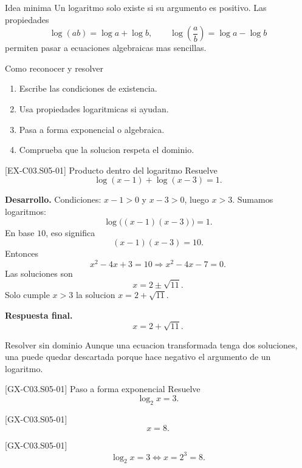 \begin{theorybox}{Idea minima}
Un logaritmo solo existe si su argumento es positivo. Las propiedades
\[
\log(ab)=\log a+\log b,\qquad \log\left(\frac{a}{b}\right)=\log a-\log b
\]
permiten pasar a ecuaciones algebraicas mas sencillas.
\end{theorybox}

\begin{methodbox}{Como reconocer y resolver}
\begin{enumerate}
  \item Escribe las condiciones de existencia.
  \item Usa propiedades logaritmicas si ayudan.
  \item Pasa a forma exponencial o algebraica.
  \item Comprueba que la solucion respeta el dominio.
\end{enumerate}
\end{methodbox}

\begin{solvedexample}{[EX-C03.S05-01] Producto dentro del logaritmo}
Resuelve
\[
\log(x-1)+\log(x-3)=1.
\]

\textbf{Desarrollo.} Condiciones: \(x-1>0\) y \(x-3>0\), luego \(x>3\). Sumamos logaritmos:
\[
\log\bigl((x-1)(x-3)\bigr)=1.
\]
En base \(10\), eso significa
\[
(x-1)(x-3)=10.
\]
Entonces
\[
x^2-4x+3=10 \Longrightarrow x^2-4x-7=0.
\]
Las soluciones son
\[
x=2\pm \sqrt{11}.
\]
Solo cumple \(x>3\) la solucion \(x=2+\sqrt{11}\).

\textbf{Respuesta final.}
\[
x=2+\sqrt{11}.
\]
\end{solvedexample}

\begin{commonerror}{Resolver sin dominio}
Aunque una ecuacion transformada tenga dos soluciones, una puede quedar descartada porque hace
negativo el argumento de un logaritmo.
\end{commonerror}

\begin{guidedexercise}{[GX-C03.S05-01] Paso a forma exponencial}
Resuelve
\[
\log_2 x=3.
\]
\end{guidedexercise}

\begin{shortanswer}{[GX-C03.S05-01]}
\[
x=8.
\]
\end{shortanswer}

\begin{fullsolution}{[GX-C03.S05-01]}
\[
\log_2 x=3 \Longleftrightarrow x=2^3=8.
\]
\end{fullsolution}

